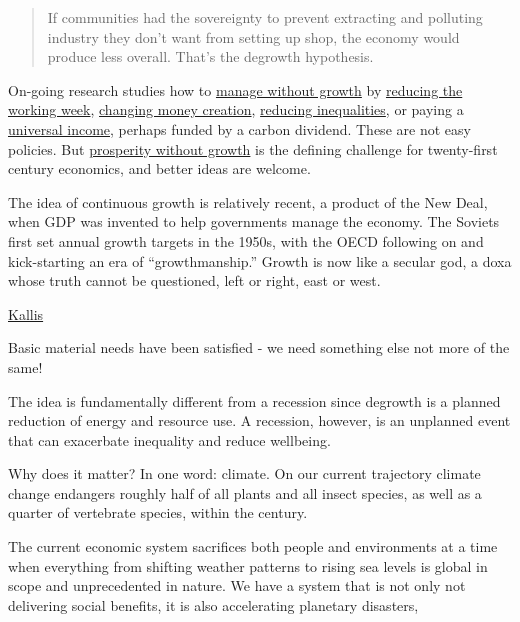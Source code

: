 \documentclass[
]{book}
\begin{document}
\begin{quote}
If communities had the sovereignty to prevent extracting and polluting industry they don't want from
setting up shop, the economy would produce less overall. That's the degrowth hypothesis.
\end{quote}

On-going research studies how to \href{https://www.e-elgar.com/shop/gbp/managing-without-growth-second-edition-9781785367397.html}{manage without growth} by \href{https://www.europeanfinancialreview.com/a-four-day-workweek-a-policy-for-improving-employment-and-environmental-conditions-in-europe/}{reducing the working week}, \href{https://positivemoney.org/publications/escaping-growth-dependency/}{changing money creation}, \href{https://www.tandfonline.com/doi/full/10.1080/09538259.2020.1769293}{reducing inequalities}, or paying a \href{https://greattransition.org/gti-forum/basic-income-standing}{universal income}, perhaps funded by a carbon dividend. These are not easy policies. But \href{https://www.routledge.com/Prosperity-without-Growth-Foundations-for-the-Economy-of-Tomorrow/Jackson/p/book/9781138935419}{prosperity without growth} is the defining challenge for twenty-first century economics, and better ideas are welcome.

The idea of continuous growth is relatively recent, a product of the New Deal, when GDP was invented to help governments manage the economy. The Soviets first set annual growth targets in the 1950s, with the OECD following on and kick-starting an era of ``growthmanship.'' Growth is now like a secular god, a doxa whose truth cannot be questioned, left or right, east or west.

\href{https://www.cato-unbound.org/2021/04/14/giorgos-kallis/why-malthuss-gospel-growth-was-still-wrong}{Kallis}

Basic material needs have been satisfied - we need something else not more of the same!

The idea is fundamentally different from a recession since
degrowth is a planned reduction of energy and resource use.
A recession, however, is an unplanned event that can exacerbate inequality and reduce wellbeing.

Why does it matter?
In one word: climate.
On our current trajectory climate change endangers roughly half of all plants and all insect species,
as well as a quarter of vertebrate species, within the century.

The current economic system sacrifices both people and environments at a time when everything from shifting weather patterns to rising sea levels is global in scope and unprecedented in nature.
We have a system that is not only not delivering social benefits, it is also accelerating planetary disasters,
\end{document}
